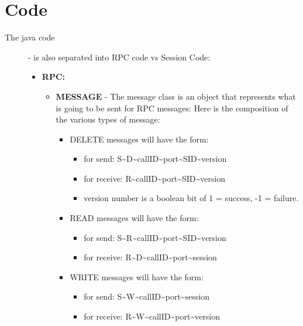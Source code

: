 \documentclass{article}
\begin{document}
\section{Code}
  \begin{description}
    \item[The java code] - is also separated into RPC code vs Session Code:
      \begin{itemize}
        \item \textbf{RPC:}
          \begin{itemize}
            \item \textbf{MESSAGE} - The message class is an object that represents what is going to be sent for RPC messages: Here is the composition of the various types of message:\\
              \begin{itemize}
                \item DELETE messages will have the form: 
                  \begin{itemize}
                    \item for send: S\textasciitilde{}D\textasciitilde{}callID\textasciitilde{}port\textasciitilde{}SID\textasciitilde{}version  
                    \item for receive: R\textasciitilde{}callID\textasciitilde{}port\textasciitilde{}SID\textasciitilde{}version 
		    \item version number is a boolean bit of 1 = success, -1 = failure.
                  \end{itemize}
                \item READ messages will have the form: 
                  \begin{itemize}
                    \item for send: S\textasciitilde{}R\textasciitilde{}callID\textasciitilde{}port\textasciitilde{}SID\textasciitilde{}version 
                    \item for receive: R\textasciitilde{}D\textasciitilde{}callID\textasciitilde{}port\textasciitilde{}session 
                  \end{itemize}
                \item WRITE messages will have the form: 
                  \begin{itemize}
                    \item for send: S\textasciitilde{}W\textasciitilde{}callID\textasciitilde{}port\textasciitilde{}session
                    \item for receive: R\textasciitilde{}W\textasciitilde{}callID\textasciitilde{}port\textasciitilde{}version

\end{itemize}
\end{itemize}
\end{itemize}
\end{itemize}
\end{description}
\end{document}
